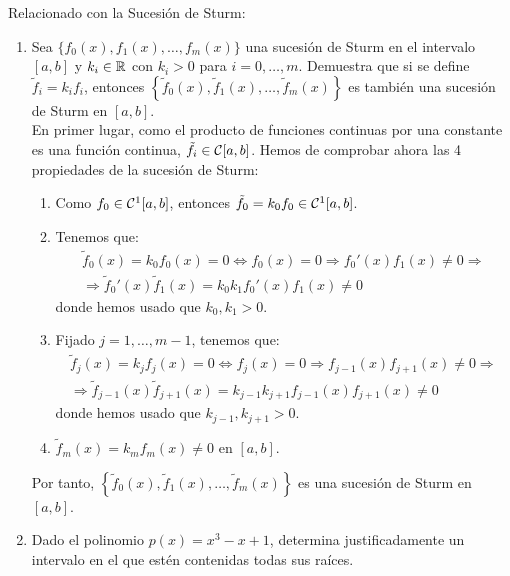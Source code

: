 \begin{ejercicio} Relacionado con la Sucesión de Sturm:
    \begin{enumerate}
        \item Sea $\{f_0(x), f_1(x), \ldots, f_m(x)\}$ una sucesión de Sturm en el intervalo $[a, b]$ y $k_i \in \mathbb{R}$ con $k_i > 0$ para $i = 0, \ldots, m$. Demuestra que si se define $\tilde{f}_i = k_i f_i$, entonces $\left\{\tilde{f}_0(x), \tilde{f}_1(x), \ldots, \tilde{f}_m(x)\right\}$ es también una sucesión de Sturm en $[a, b]$.\\
        
        En primer lugar, como el producto de funciones continuas por una constante es una función continua, $\tilde{f}_i\in \mathcal{C}[a, b]$.
        Hemos de comprobar ahora las 4 propiedades de la sucesión de Sturm:
        \begin{enumerate}
            \item Como $f_0\in \mathcal{C}^1[a, b]$, entonces $\tilde{f}_0=k_0f_0\in \mathcal{C}^1[a, b]$.
            \item Tenemos que:
            \begin{multline*}
                \tilde{f}_0(x) = k_0f_0(x) = 0\iff f_0(x) = 0\Longrightarrow f_0'(x)f_1(x)\neq 0
                \Longrightarrow \\\Longrightarrow \tilde{f}_0'(x)\tilde{f}_1(x)=k_0k_1f_0'(x)f_1(x)\neq 0
            \end{multline*}
            donde hemos usado que $k_0,k_1>0$.
            \item Fijado $j=1,\ldots,m-1$, tenemos que:
            \begin{multline*}
                \tilde{f}_j(x) = k_jf_j(x) = 0\iff f_j(x) = 0\Longrightarrow f_{j-1}(x)f_{j+1}(x)\neq 0
                \Longrightarrow \\\Longrightarrow \tilde{f}_{j-1}(x)\tilde{f}_{j+1}(x)=k_{j-1}k_{j+1}f_{j-1}(x)f_{j+1}(x)\neq 0
            \end{multline*}
            donde hemos usado que $k_{j-1},k_{j+1}>0$.
            \item $\tilde{f}_m(x) = k_mf_m(x)\neq 0$ en $[a, b]$.
        \end{enumerate}
        Por tanto, $\left\{\tilde{f}_0(x), \tilde{f}_1(x), \ldots, \tilde{f}_m(x)\right\}$ es una sucesión de Sturm en $[a, b]$.
        \item Dado el polinomio $p(x) = x^3 - x + 1$, determina justificadamente un intervalo en el que estén contenidas todas sus raíces.\\
        

\end{enumerate}
\end{ejercicio}
